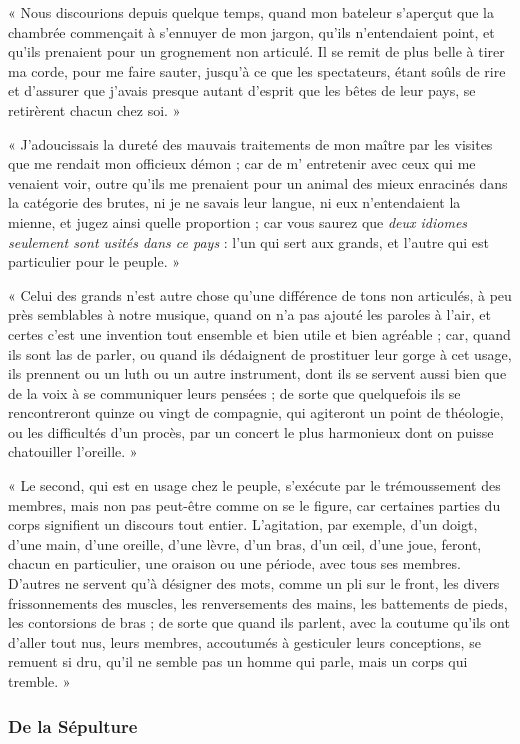 \documentclass[a4paper, 11pt, oneside]{article}
\begin{document}
« Nous discourions depuis quelque temps, quand mon bateleur s'aperçut que la chambrée commençait à s'ennuyer de mon jargon, qu'ils n'entendaient point, et qu'ils prenaient pour un grognement non articulé. Il se remit de plus belle à tirer ma corde, pour me faire sauter, jusqu'à ce que les spectateurs, étant soûls de rire et d'assurer que j'avais presque autant d'esprit que les bêtes de leur pays, se retirèrent chacun chez soi. »

« J'adoucissais la dureté des mauvais traitements de mon maître par les visites que me rendait mon officieux démon ; car de m' entretenir avec ceux qui me venaient voir, outre qu'ils me prenaient pour un animal des mieux enracinés dans la catégorie des brutes, ni je ne savais leur langue, ni eux n'entendaient la mienne, et jugez ainsi quelle proportion ; car vous saurez que \emph{deux idiomes seulement sont usités dans ce pays} : l'un qui sert aux grands, et l'autre qui est particulier pour le peuple. »

« Celui des grands n'est autre chose qu'une différence de tons non articulés, à peu près semblables à notre musique, quand on n'a pas ajouté les paroles à l'air, et certes c'est une invention tout ensemble et bien utile et bien agréable ; car, quand ils sont las de parler, ou quand ils dédaignent de prostituer leur gorge à cet usage, ils prennent ou un luth ou un autre instrument, dont ils se servent aussi bien que de la voix à se communiquer leurs pensées ; de sorte que quelquefois ils se rencontreront quinze ou vingt de compagnie, qui agiteront un point de théologie, ou les difficultés d'un procès, par un concert le plus harmonieux dont on puisse chatouiller l'oreille. »

« Le second, qui est en usage chez le peuple, s'exécute par le trémoussement des membres, mais non pas peut-être comme on se le figure, car certaines parties du corps signifient un discours tout entier. L'agitation, par exemple, d'un doigt, d'une main, d'une oreille, d'une lèvre, d'un bras, d'un œil, d'une joue, feront, chacun en particulier, une oraison ou une période, avec tous ses membres. D'autres ne servent qu'à désigner des mots, comme un pli sur le front, les divers frissonnements des muscles, les renversements des mains, les battements de pieds, les contorsions de bras ; de sorte que quand ils parlent, avec la coutume qu'ils ont d'aller tout nus, leurs membres, accoutumés à gesticuler leurs conceptions, se remuent si dru, qu'il ne semble pas un homme qui parle, mais un corps qui tremble. »

\subsubsection{De la Sépulture}
\end{document}
